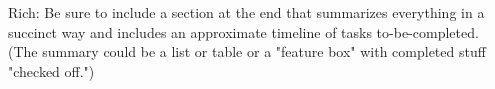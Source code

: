 Rich: Be sure to include a section at the end that summarizes everything in a succinct way and includes an approximate timeline of tasks to-be-completed. (The summary could be a list or table or a "feature box" with completed stuff "checked off.")